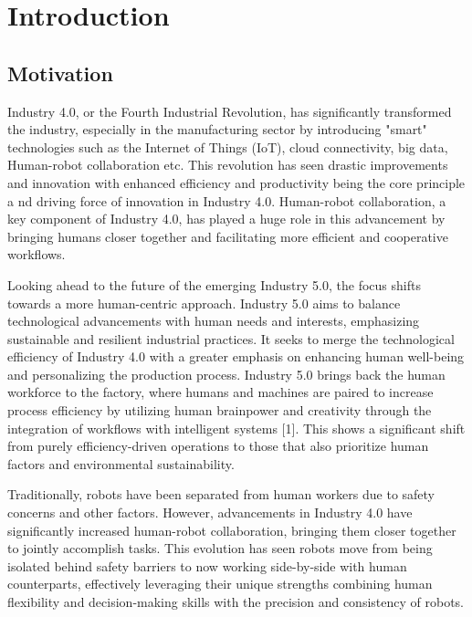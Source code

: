 \chapter{Introduction}
\label{aufbau}

\section{Motivation}
\label{hinweise:titelblatt}
Industry 4.0, or the Fourth Industrial Revolution, has significantly transformed the industry, 
especially in the manufacturing sector by introducing 
"smart" technologies such as the Internet of Things (IoT), 
cloud connectivity, big data, Human-robot collaboration etc. 
This revolution has seen drastic improvements and innovation 
with enhanced efficiency and productivity being the core principle a
nd driving force of innovation in Industry 4.0. Human-robot collaboration, 
a key component of Industry 4.0, has played a huge role in this advancement 
by bringing humans closer together and facilitating more efficient and cooperative workflows.  


Looking ahead to the future of the emerging Industry 5.0, the focus shifts 
towards a more human-centric approach. Industry 5.0 aims to balance technological 
advancements with human needs and interests, emphasizing sustainable and resilient
industrial practices. It seeks to merge the technological efficiency of Industry 
4.0 with a greater emphasis on enhancing human well-being and personalizing the
production process. Industry 5.0 brings back the human workforce to the factory,
where humans and machines are paired to increase process efficiency by utilizing 
human brainpower and creativity through the integration of workflows with intelligent systems \textcite{hum1}[1]. This shows a significant shift from purely efficiency-driven operations to those that also prioritize human factors and environmental sustainability. 


Traditionally, robots have been separated from human 
workers due to safety concerns and other factors.
 However, advancements in Industry 4.0 have significantly increased human-robot collaboration, bringing them closer together to jointly accomplish tasks. This evolution has seen robots move from being isolated behind safety barriers to now working side-by-side with human counterparts, effectively leveraging their unique strengths combining human flexibility and decision-making skills with the precision and consistency of robots.  


